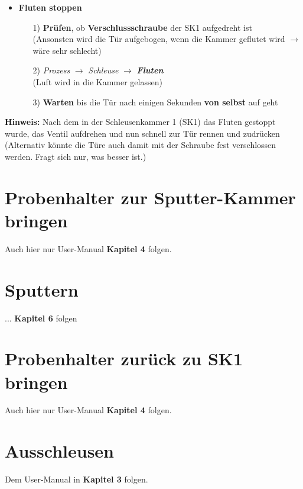 \documentclass[
  ngerman,
  twoside,
  captions=tableheading,
  BCOR=.5cm,
  fontsize=11,
  ]{scrreprt}
\begin{document}
\begin{itemize}
\item \textbf{Fluten stoppen}
\begin{itemize}
\item[1)] \textbf{Prüfen}, ob \textbf{Verschlussschraube} der SK1 aufgedreht ist\\
(Ansonsten wird die Tür aufgebogen, wenn die Kammer geflutet wird $\rightarrow$ wäre sehr schlecht)
\item[2)] \textit{Prozess} $\rightarrow$ \textit{Schleuse} $\rightarrow$ \textit{\textbf{Fluten}}\\
(Luft wird in die Kammer gelassen)
\item[3)] \textbf{Warten} bis die Tür nach einigen Sekunden \textbf{von selbst} auf geht
\end{itemize}



\end{itemize}


\textbf{Hinweis:} Nach dem in der Schleusenkammer 1 (SK1) das Fluten gestoppt wurde, das Ventil aufdrehen und nun schnell zur Tür rennen und zudrücken (Alternativ könnte die Türe auch damit mit der Schraube fest verschlossen werden. Fragt sich nur, was besser ist.)

\section{Probenhalter zur Sputter-Kammer bringen}
Auch hier nur User-Manual \textbf{Kapitel 4} folgen.

\section{Sputtern}
... \textbf{Kapitel 6} folgen

\section{Probenhalter zurück zu SK1 bringen}
Auch hier nur User-Manual \textbf{Kapitel 4} folgen.

\section{Ausschleusen}
Dem User-Manual in \textbf{Kapitel 3} folgen.\\
\printbibliography
\end{document}
